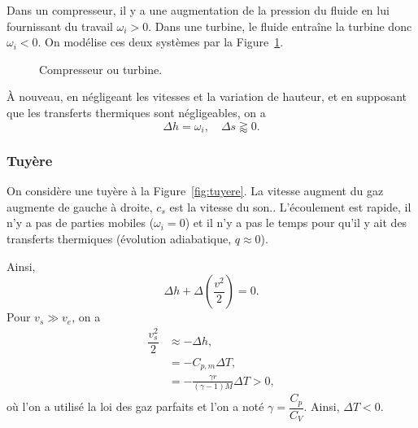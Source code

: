             Dans un compresseur, il y a une augmentation de la pression du fluide en lui fournissant du travail $\omega_i>0$. Dans une turbine, le fluide entraîne la turbine donc $\omega_i<0$. On modélise ces deux systèmes par la Figure~\ref{fig:compresseur_turbine}.

            \begin{figure}
                \centering
                \caption{Compresseur ou turbine.}    
                \label{fig:compresseur_turbine}
            \end{figure}

            À nouveau, en négligeant les vitesses et la variation de hauteur, et en supposant que les transferts thermiques sont négligeables, on a 
            \begin{equation*}
                \boxed{
                    \Delta h=\omega_i,\quad \Delta s\gtrapprox0.
                }
            \end{equation*}

        \subsubsection{Tuyère}
            On considère une tuyère à la Figure~\ref{fig:tuyere}. La vitesse augment du gaz augmente de gauche à droite, $c_s$ est la vitesse du son.. L'écoulement est rapide, il n'y a pas de parties mobiles ($\omega_i=0$) et il n'y a pas le temps pour qu'il y ait des transferts thermiques (évolution adiabatique, $q\approx0$).

            Ainsi,
            \begin{equation*}
                \Delta h+\Delta\left(\frac{v^{2}}{2}\right)=0.
            \end{equation*}
            Pour $v_s\gg v_e$, on a
            \begin{align*}
                \dfrac{v_s^{2}}{2}
                &\approx-\Delta h,\\
                &=-C_{p,m}\Delta T,\\
                &=-\frac{\gamma r}{\left(\gamma-1\right)M}\Delta T>0,
            \end{align*}
            où l'on a utilisé la loi des gaz parfaits et l'on a noté $\gamma=\dfrac{C_p}{C_V}$. Ainsi, $\Delta T<0$.

